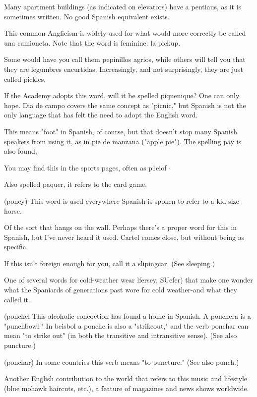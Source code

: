  Many apartment buildings (as indicated on elevators) have a pentiaus, as it is sometimes written. No good Spanish
equivalent exists.

 This common Anglicism is widely used for what
would more correctly be called una camioneta. Note that the word is
feminine: la pickup.

 Some would have you call them pepinillos agrios,
while others will tell you that they are legumbres encurtidas. Increasingly, and not surprisingly, they are just called pickles.

 If the Academy adopts this word, will it be spelled piquenique? One can only hope. Dia de campo covers the same concept
as "picnic," but Spanish is not the only language that has felt the need
to adopt the English word.

 This means "foot" in Spanish, of course, but that doesn't
stop many Spanish speakers from using it, as in pie de manzana
("apple pie"). The spelling pay is also found,

 You may find this in the sports pages, often as
p1eiof·

 Also spelled paquer, it refers to the card game.

 (poney) This word is used everywhere Spanish is spoken to refer to a kid-size horse.

 Of the sort that hangs on the wall. Perhaps there's a
proper word for this in Spanish, but I've never heard it used. Cartel
comes close, but without being as specific.

 If this isn't foreign enough for you, call it a slipingcar. (See sleeping.)

 One of several words for cold-weather wear lfersey, SUefer) that make one wonder what the Spaniards of generations
past wore for cold weather-and what they called it.

 (ponchel This alcoholic concoction has found a home
in Spanish. A ponchera is a "punchbowl." In beisbol a ponche is also
a "strikeout," and the verb ponchar can mean "to strike out" (in both
the transitive and intransitive sense). (See also puncture.)

 (ponchar) In some countries this verb means "to
puncture." (See also punch.)

 Another English contribution to the world that refers
to this music and lifestyle (blue mohawk haircuts, etc.), a feature of
magazines and news shows worldwide.

